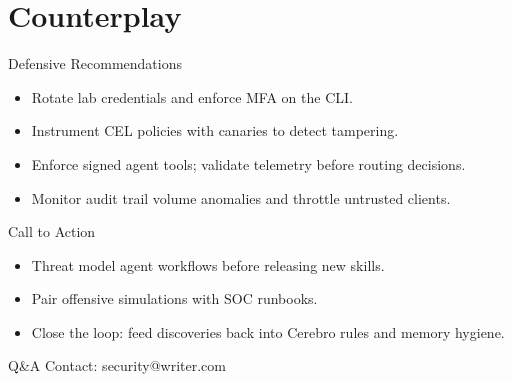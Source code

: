 \documentclass[aspectratio=169]{beamer}
\begin{document}
\section{Counterplay}

\begin{frame}{Defensive Recommendations}
  \begin{itemize}
    \item Rotate lab credentials and enforce MFA on the CLI.
    \item Instrument CEL policies with canaries to detect tampering.
    \item Enforce signed agent tools; validate telemetry before routing decisions.
    \item Monitor audit trail volume anomalies and throttle untrusted clients.
  \end{itemize}
\end{frame}

\begin{frame}{Call to Action}
  \begin{itemize}
    \item Threat model agent workflows before releasing new skills.
    \item Pair offensive simulations with SOC runbooks.
    \item Close the loop: feed discoveries back into Cerebro rules and memory hygiene.
  \end{itemize}
\end{frame}

\begin{frame}{Q\&A}
  \centering
  Contact: security@writer.com
\end{frame}
\end{document}
